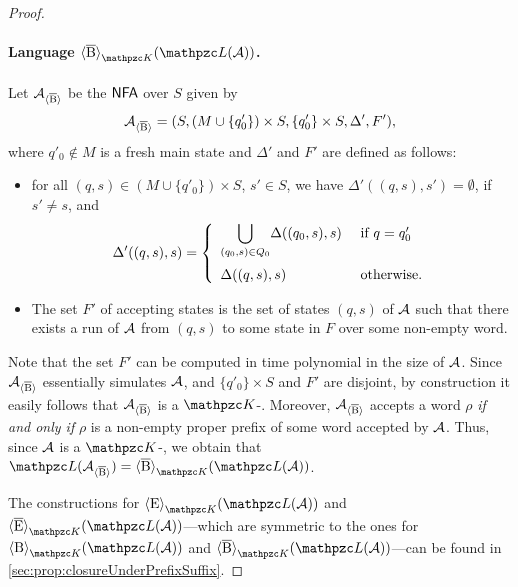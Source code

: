 \begin{proof}
\paragraph*{Language  $\hsBt_{\Ku}(\Lang(\Au))$.} Let $\mathcal{A}_{\operatorname{\langle \overline{B}\rangle}}$ be the $\text{\sffamily NFA}$ over $S$ given by 
\[\mathcal{A}_{\operatorname{\langle \overline{B}\rangle}}=(S,(M\cup \{q'_0\})\times S ,\{q'_0\}\times S,\Delta',F'),\] where $q'_0\notin M$ is a fresh main state and $\Delta'$ and $F'$ are defined as follows:
\begin{itemize}
  \item for all
$(q,s)\in (M\cup \{q'_0\})\times S$, $s'\in S$, we have $\Delta'((q,s),s')=\emptyset$, if $s'\neq s$, and 
%
\[
 \Delta'((q,s),s) = \left\{
    \begin{array}{ll}
   \displaystyle{\bigcup_{(q_0,s)\in Q_0}}\Delta((q_0,s),s)
      &    \text{ if } q=q'_0 \medskip
      \\
    \Delta((q,s),s)
      &    \text{ otherwise.}
    \end{array}
  \right.
\]
%
  \item The set $F'$ of accepting states is the set of states $(q,s)$ of $\mathcal{A}$ such that there exists a run of $\mathcal{A}$ from $(q,s)$ to some state in $F$ over some non-empty word.
\end{itemize}

Note that the set $F'$ can be computed in time polynomial in the size of $\mathcal{A}$. Since   $\mathcal{A}_{\operatorname{\langle \overline{B}\rangle}}$ essentially simulates $\mathcal{A}$, and $\{q'_0\}\times S$ and $F'$ are disjoint,
by construction it easily follows that $\mathcal{A}_{\operatorname{\langle \overline{B}\rangle}}$ is a $\Ku$-\NFA. Moreover, $\mathcal{A}_{\operatorname{\langle \overline{B}\rangle}}$ accepts a word $\rho$ \emph{if and only if} $\rho$ is a non-empty proper prefix of some word accepted by $\mathcal{A}$.
Thus, since $\mathcal{A}$ is a $\Ku$-\NFA, we obtain that $\Lang(\Au_{\hsBt})=\hsBt_{\Ku}(\Lang(\Au))$.%


The constructions for $\hsE_{\Ku}(\Lang(\Au))$ and $\hsEt_{\Ku}(\Lang(\Au))$---which are symmetric to the ones for $\hsB_{\Ku}(\Lang(\Au))$ and $\hsBt_{\Ku}(\Lang(\Au))$---can be found in \ref{sec:prop:closureUnderPrefixSuffix}.
\end{proof}

